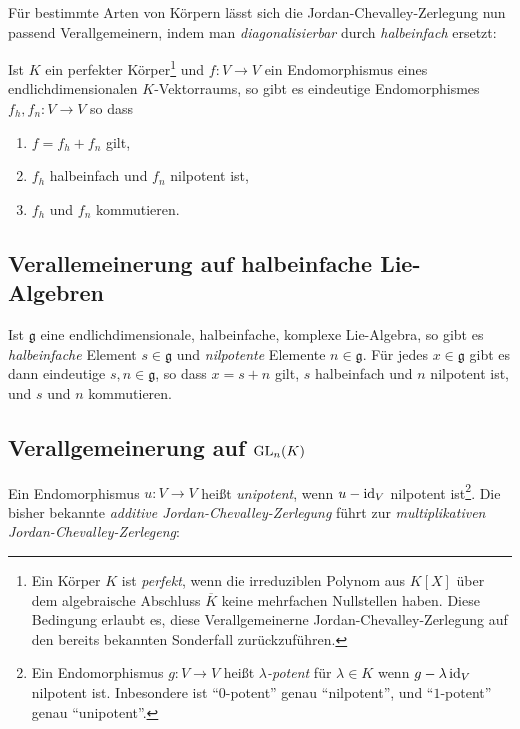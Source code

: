 Für bestimmte Arten von Körpern lässt sich die Jordan-Chevalley-Zerlegung nun passend Verallgemeinern, indem man \emph{diagonalisierbar} durch \emph{halbeinfach} ersetzt:

\begin{theorem*}
  Ist $K$ ein perfekter Körper\footnote{
  Ein Körper $K$ ist \emph{perfekt}, wenn die irreduziblen Polynom aus $K[X]$ über dem algebraische Abschluss $\overline{K}$ keine mehrfachen Nullstellen haben. 
  Diese Bedingung erlaubt es, diese Verallgemeinerne Jordan-Chevalley-Zerlegung auf den bereits bekannten Sonderfall zurückzuführen.}
  und $f \colon V \to V$ ein Endomorphismus eines endlichdimensionalen $K$-Vektorraums, so gibt es eindeutige Endomorphismes $f_h, f_n \colon V \to V$ so dass
  \begin{enumerate}
    \item
      $f = f_h + f_n$ gilt,
    \item
      $f_h$ halbeinfach und $f_n$ nilpotent ist,
    \item
      $f_h$ und $f_n$ kommutieren.
  \end{enumerate}
\end{theorem*}



\subsection*{Verallemeinerung auf halbeinfache Lie-Algebren}

Ist $\mathfrak{g}$ eine endlichdimensionale, halbeinfache, komplexe Lie-Algebra, so gibt es \emph{halbeinfache} Element $s \in \mathfrak{g}$ und \emph{nilpotente} Elemente $n \in \mathfrak{g}$.
Für jedes $x \in \mathfrak{g}$ gibt es dann eindeutige $s, n \in \mathfrak{g}$, so dass $x = s + n$ gilt, $s$ halbeinfach und $n$ nilpotent ist, und $s$ und $n$ kommutieren.



\subsection*{Verallgemeinerung auf $\operatorname{GL}_{n}(K)$}

Ein Endomorphismus $u \colon V \to V$ heißt \emph{unipotent}, wenn $u - \operatorname{id}_V$ nilpotent ist\footnote{
Ein Endomorphismus $g \colon V \to V$ heißt \emph{$\lambda$-potent} für $\lambda \in K$ wenn $g - \lambda \operatorname{id}_V$ nilpotent ist.
Inbesondere ist \enquote{$0$-potent} genau \enquote{nilpotent}, und \enquote{$1$-potent} genau \enquote{unipotent}.}.
Die bisher bekannte \emph{additive Jordan-Chevalley-Zerlegung} führt zur \emph{multiplikativen Jordan-Chevalley-Zerlegeng}:

